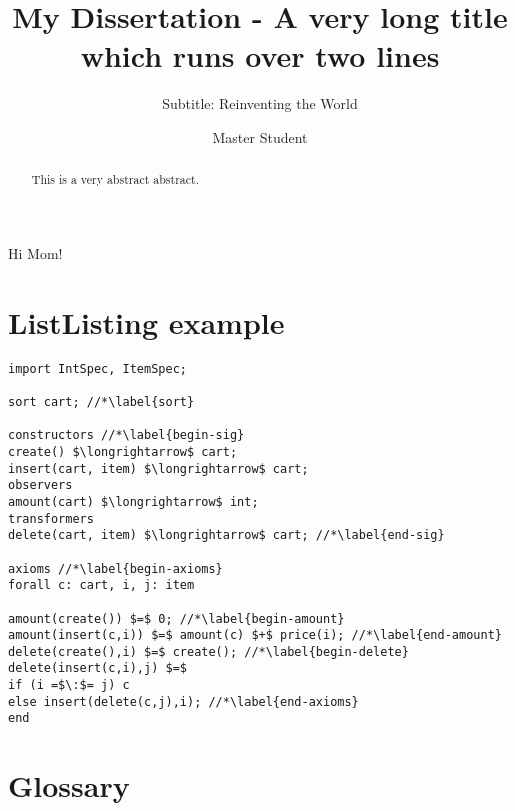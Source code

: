 \documentclass[mscthesis, 11pt]{usiinfthesis}
\title{My Dissertation - A very long title\\ which runs over two
  lines} %
\subtitle{Subtitle: Reinventing the World} %
\author{Master Student} %
\begin{document}
\maketitle %

\frontmatter %

\begin{abstract}
This is a very abstract abstract. 
\end{abstract}


\begin{acknowledgements}
	Hi Mom!
\end{acknowledgements}

\tableofcontents 
\listoffigures %
\listoftables %

\mainmatter















\chapter{ListListing example}
\begin{lstlisting}
import IntSpec, ItemSpec;

sort cart; //*\label{sort}

constructors //*\label{begin-sig}
create() $\longrightarrow$ cart;
insert(cart, item) $\longrightarrow$ cart;
observers
amount(cart) $\longrightarrow$ int;
transformers
delete(cart, item) $\longrightarrow$ cart; //*\label{end-sig}

axioms //*\label{begin-axioms}
forall c: cart, i, j: item 

amount(create()) $=$ 0; //*\label{begin-amount}
amount(insert(c,i)) $=$ amount(c) $+$ price(i); //*\label{end-amount}
delete(create(),i) $=$ create(); //*\label{begin-delete}
delete(insert(c,i),j) $=$
if (i =$\:$= j) c
else insert(delete(c,j),i); //*\label{end-axioms}
end
\end{lstlisting}



\backmatter

\chapter{Glossary} %

%
%



\lipsum
\end{document}
